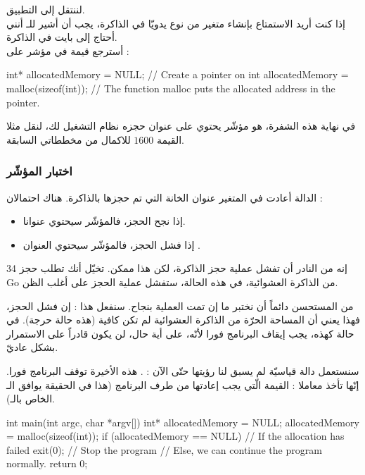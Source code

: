 لننتقل إلى التطبيق.\\
إذا كنت أريد الاستمتاع بإنشاء متغير من نوع
يدويّا في الذاكرة، يجب أن أشير للـ
أنني أحتاج إلى
بايت في الذاكرة.\\
أسترجع قيمة
في مؤشر على
 :

\begin{Csource}
int* allocatedMemory = NULL; // Create a pointer on int
allocatedMemory = malloc(sizeof(int)); // The function malloc puts the allocated address in the pointer.
\end{Csource}

في نهاية هذه الشفرة،
هو مؤشّر يحتوي على عنوان حجزه نظام التشغيل لك، لنقل مثلا القيمة
$1600$
للاكمال من مخططاتي السابقة.

\subsubsection{اختبار المؤشّر}
الدالة
أعادت في المتغير
عنوان الخانة التي تم حجزها بالذاكرة. هناك احتمالان :
\begin{itemize}
  \item إذا نجح الحجز، فالمؤشّر سيحتوي عنوانا.
  \item إذا فشل الحجز، فالمؤشّر سيحتوي العنوان
.
\end{itemize}

إنه من النادر أن تفشل عملية حجز الذاكرة، لكن هذا ممكن. تخيّل أنك تطلب حجز 34
\textenglish{Go}
من الذاكرة العشوائية، في هذه الحالة، ستفشل عملية الحجز على أغلب الظن.

من المستحسن دائماً أن نختبر ما إن تمت العملية بنجاح. سنفعل هذا : إن فشل الحجز، فهذا يعني أن المساحة الحرّة من الذاكرة العشوائية لم تكن كافية (هذه حالة حرجة). في حالة كهذه، يجب إيقاف البرنامج فورا لأنّه، على أية حال، لن يكون قادراً على الاستمرار بشكل عاديّ.

سنستعمل دالة قياسيّة لم يسبق لنا رؤيتها حتّى الآن :
.
هذه الأخيرة توقف البرنامج فورا. إنّها تأخذ معاملا : القيمة الّتي يجب إعادتها من طرف البرنامج (هذا في الحقيقة يوافق الـ
الخاص بالـ).

\begin{Csource}
int main(int argc, char *argv[])
{
	int* allocatedMemory = NULL;
	allocatedMemory = malloc(sizeof(int));
	if (allocatedMemory == NULL) // If the allocation has failed
	{
    exit(0); // Stop the program
	}
	// Else, we can continue the program normally.
	return 0;
}
\end{Csource}

